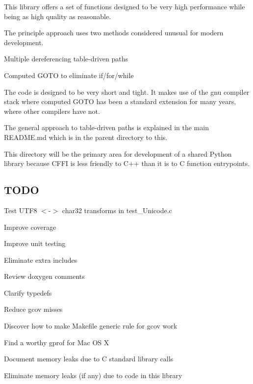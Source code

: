 This library offers a set of functions designed to be very high performance while being as high quality as reasonable.

The principle approach uses two methods considered unusual for modern development.
\begin{DoxyItemize}
\item Multiple dereferencing table-\/driven paths
\item Computed G\+O\+T\+O to eliminate if/for/while
\end{DoxyItemize}

The code is designed to be very short and tight. It makes use of the gnu compiler stack where computed G\+O\+T\+O has been a standard extension for many years, where other compilers have not.

The general approach to table-\/driven paths is explained in the main R\+E\+A\+D\+M\+E.\+md which is in the parent directory to this.

This directory will be the primary area for development of a shared Python library because C\+F\+F\+I is less friendly to C++ than it is to C function entrypoints.

\subsection*{T\+O\+D\+O}


\begin{DoxyItemize}
\item Test U\+T\+F8 $<$-\/$>$ char32 transforms in test\+\_\+\+Unicode.\+c
\item Improve coverage
\item Improve unit testing
\item Eliminate extra includes
\item Review doxygen comments
\item Clarify typedefs
\item Reduce gcov misses
\item Discover how to make Makefile generic rule for gcov work
\item Find a worthy gprof for Mac O\+S X
\item Document memory leaks due to C standard library calls
\item Eliminate memory leaks (if any) due to code in this library 
\end{DoxyItemize}